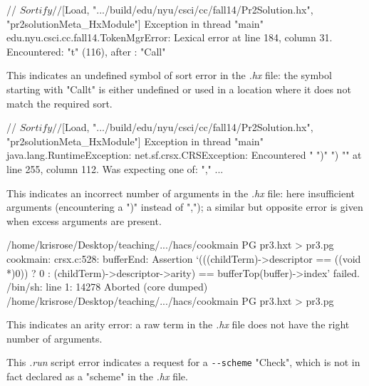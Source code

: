 \documentclass[12pt]{article} %
\begin{document}
\begin{error}\leavevmode
  \begin{code}
// $Sortify
// $[Load, ".../build/edu/nyu/csci/cc/fall14/Pr2Solution.hx", "pr2solutionMeta_HxModule"]
Exception in thread "main" edu.nyu.csci.cc.fall14.TokenMgrError:
   Lexical error at line 184, column 31.  Encountered: "t" (116), after : "Call"
  \end{code}
  This indicates an undefined symbol of sort error in the \emph{.hx} file: the symbol
  starting with "Callt" is either undefined or used in a location where it does not match the
  required sort.
\end{error}

\begin{error}\leavevmode
  \begin{code}
// $Sortify
// $[Load, ".../build/edu/nyu/csci/cc/fall14/Pr2Solution.hx", "pr2solutionMeta_HxModule"]
Exception in thread "main" java.lang.RuntimeException: net.sf.crsx.CRSException:
   Encountered " ")" ") "" at line 255, column 112.
Was expecting one of:
    "," ...
  \end{code}
  This indicates an incorrect number of arguments in the \emph{.hx} file: here insufficient
  arguments (encountering a ")" instead of ","); a similar but opposite error is given when excess
  arguments are present.
\end{error}

\begin{error}\leavevmode
  \begin{code}
/home/krisrose/Desktop/teaching/.../hacs/cookmain PG pr3.hxt > pr3.pg
cookmain: crsx.c:528: bufferEnd: Assertion
   `(((childTerm)->descriptor == ((void *)0)) ? 0 :
        (childTerm)->descriptor->arity) == bufferTop(buffer)->index' failed.
/bin/sh: line 1: 14278 Aborted
  (core dumped) /home/krisrose/Desktop/teaching/.../hacs/cookmain PG pr3.hxt > pr3.pg
  \end{code}
  This indicates an arity error: a raw term in the \emph{.hx} file does not have the right number of
  arguments.
\end{error}

\begin{error}[]\leavevmode
  \begin{code}
« $Print-Check[
...
»
  \end{code}
  This \emph{.run} script error indicates a request for a \verb'--scheme' "Check", which is not in
  fact declared as a "scheme" in the \emph{.hx} file.
\end{error}
\end{document}
